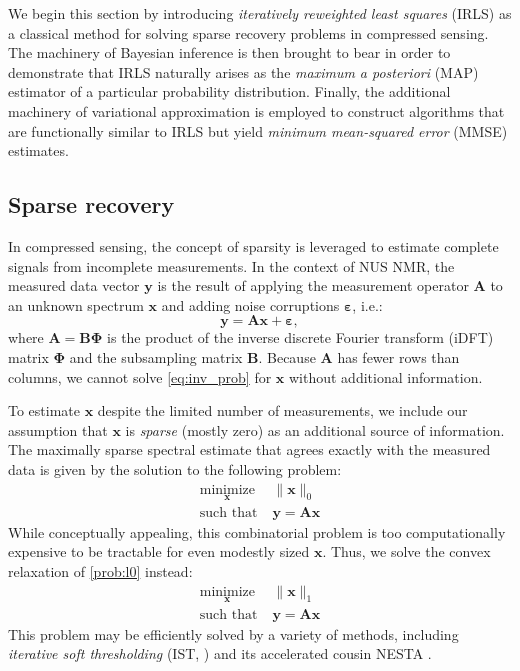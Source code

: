\documentclass[final,5p,times,twocolumn]{elsarticle}
\newcommand{\m}[1]{\boldsymbol{#1}}
\begin{document}
We begin this section by introducing \emph{iteratively
reweighted least squares} (IRLS) as a classical method for solving sparse
recovery problems in compressed sensing. The machinery of Bayesian inference
is then brought to bear in order to demonstrate that IRLS naturally arises
as the \emph{maximum a posteriori} (MAP) estimator of a particular
probability distribution. Finally, the additional machinery of variational
approximation is employed to construct algorithms that are functionally
similar to IRLS but yield \emph{minimum mean-squared error} (MMSE)
estimates.

\subsection{Sparse recovery}
\label{ss:cs}
In compressed sensing, the concept of sparsity is leveraged to estimate
complete signals from incomplete measurements. In the context of NUS
NMR, the measured data vector $\m{y}$ is the result of applying the
measurement operator $\m{A}$ to an unknown spectrum $\m{x}$ and adding
noise corruptions $\m{\varepsilon}$, i.e.:
\begin{equation}
\m{y} = \m{A} \m{x} + \m{\varepsilon},
\label{eq:inv_prob}
\end{equation}
where $\m{A} = \m{B} \m{\Phi}$ is the product of the inverse discrete
Fourier transform (iDFT) matrix $\m{\Phi}$ and the subsampling matrix
$\m{B}$. Because $\m{A}$ has fewer rows than columns, we cannot solve
\eqref{eq:inv_prob} for $\m{x}$ without additional information.

To estimate $\m{x}$ despite the limited number of measurements, we include
our assumption that $\m{x}$ is \emph{sparse} (mostly zero) as an additional
source of information. The maximally sparse spectral estimate that agrees
exactly with the measured data is given by the solution to the following
problem:
\begin{equation}
\begin{aligned}
 \underset{\m{x}}{\text{minimize}} &\; \|\m{x}\|_0 \\
 \text{such that} &\; \m{y} = \m{A} \m{x}
\end{aligned}
\label{prob:l0}
\end{equation}
While conceptually appealing, this combinatorial problem is too
computationally expensive to be tractable for even modestly sized $\m{x}$.
Thus, we solve the convex relaxation of \eqref{prob:l0} instead:
\begin{equation}
\begin{aligned}
 \underset{\m{x}}{\text{minimize}} &\; \|\m{x}\|_1 \\
 \text{such that} &\; \m{y} = \m{A} \m{x}
\end{aligned}
\label{prob:l1}
\end{equation}
This problem may be efficiently solved by a variety of methods, including
\emph{iterative soft thresholding} (IST, \cite{stern:jmr2007}) and its
accelerated cousin NESTA \cite{becker:siam2011,sun:jbnmr2015}.
\end{document}
